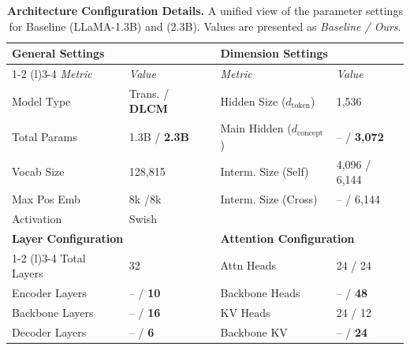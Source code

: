 \begin{table}[ht]
\centering
\caption{\textbf{Architecture Configuration Details.} A unified view of the parameter settings for Baseline (LLaMA-1.3B) and \ModelName{} (2.3B). Values are presented as \textit{Baseline / Ours}.}
\label{tab:architecture_comparison}
\small
\renewcommand{\arraystretch}{1.2} %
\setlength{\tabcolsep}{5pt}       %

\begin{tabular}{ll @{\hspace{1.2cm}} ll} %
    \toprule
    \multicolumn{2}{l}{\textbf{General Settings}} & \multicolumn{2}{l}{\textbf{Dimension Settings}} \\
    \cmidrule(r){1-2} \cmidrule(l){3-4} %
    \textit{Metric} & \textit{Value} & \textit{Metric} & \textit{Value} \\
    \midrule
    Model Type      & Trans. / \textbf{DLCM}    & Hidden Size ($d_{\text{token}}$)   & 1,536 \\
    Total Params    & 1.3B / \textbf{2.3B}      & Main Hidden ($d_{\text{concept}}$) & -- / \textbf{3,072} \\
    Vocab Size      & 128,815                   & Interm. Size (Self)                & 4,096 / 6,144 \\
    Max Pos Emb     & 8k /8k         & Interm. Size (Cross)               & -- / 6,144 \\
    Activation      & Swish                     &                                    & \\ %
    \midrule
    
    \multicolumn{2}{l}{\textbf{Layer Configuration}} & \multicolumn{2}{l}{\textbf{Attention Configuration}} \\
    \cmidrule(r){1-2} \cmidrule(l){3-4}
    Total Layers    & 32                        & Attn Heads      & 24 / 24 \\
    Encoder Layers  & -- / \textbf{10}          & Backbone Heads  & -- / \textbf{48} \\
    Backbone Layers & -- / \textbf{16}          & KV Heads        & 24 / 12 \\
    Decoder Layers  & -- / \textbf{6}           & Backbone KV     & -- / \textbf{24} \\
    \bottomrule
\end{tabular}
\end{table}

